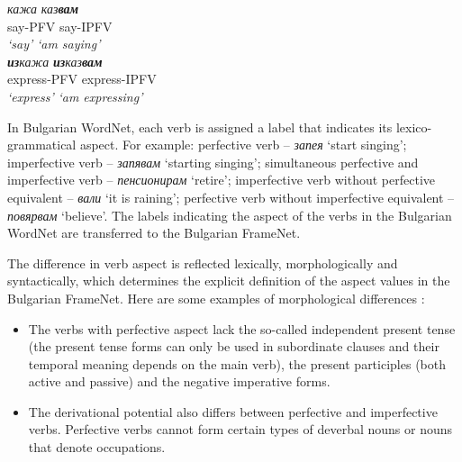 \documentclass[output=paper,colorlinks,citecolor=brown]{langscibook}
\begin{document}
\begin{exe}
 \ex  \label{ch01:ex:24}
 \glll \textit{кажа} \hspace{1.2cm} \textit{каз\textbf{вам}}\\
say-PFV  \hspace{1cm} say-IPFV\\
 \textit{`say'} \hspace{1.3cm} \textit{`am saying'} \\

 \ex  \label{ch01:ex:25}
 \glll  \textit{\textbf{из}кажа} \hspace{1.0cm} \textit{\textbf{из}каз\textbf{вам}}\\
express-PFV  \hspace{0.3cm} express-IPFV\\
  \textit{`express'} \hspace{0.9cm} \textit{`am expressing'}\\
 \end{exe} 

In Bulgarian WordNet, each verb is assigned a label that indicates its lexico-grammatical aspect. For example: perfective verb -- \textit{запея} `start singing'; imperfective verb -- \textit{запявам} `starting singing'; simultaneous perfective and imperfective verb -- \textit{пенсионирам} `retire'; imperfective verb without perfective equivalent -- \textit{вали} `it is raining'; perfective verb without imperfective equivalent -- \textit{повярвам} `believe'. The labels indicating the aspect of the verbs in the Bulgarian WordNet are transferred to the Bulgarian FrameNet.

The difference in verb aspect is reflected lexically, morphologically and syntactically, which determines the explicit definition of the aspect values in the Bulgarian FrameNet. Here are some examples of morphological differences \citep[256]{Nitsolova2008}:

\begin{itemize}
 
\item The verbs with perfective aspect lack the so-called independent present tense (the present tense forms can only be used in subordinate clauses and their temporal meaning depends on the main verb), the present participles (both active and passive) and the negative imperative forms.

\item The derivational potential also differs between perfective and imperfective verbs. Perfective verbs cannot form certain types of deverbal nouns or nouns that denote occupations.

\end{itemize}
\end{document}
